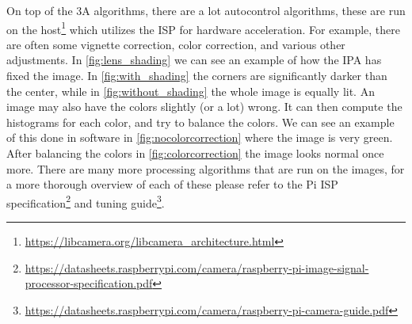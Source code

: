 On top of the 3A algorithms, there are a lot autocontrol algorithms, these are
run on the host\footnote{\url{https://libcamera.org/libcamera_architecture.html}}
which utilizes the ISP for hardware acceleration. For example, there are often some
vignette correction, color correction, and various other adjustments. In
\cref{fig:lens_shading} we can see an example of how the IPA has fixed the
image. In \cref{fig:with_shading} the corners are significantly darker than the
center, while in \cref{fig:without_shading} the whole image is equally lit. An
image may also have the colors slightly (or a lot) wrong. It can then compute
the histograms for each color, and try to balance the colors. We can see an
example of this done in software in \cref{fig:nocolorcorrection} where the
image is very green. After balancing the colors in \cref{fig:colorcorrection}
the image looks normal once more. There are many more processing algorithms
that are run on the images, for a more thorough overview of each of these
please refer to the Pi ISP
specification\footnote{\url{https://datasheets.raspberrypi.com/camera/raspberry-pi-image-signal-processor-specification.pdf}}
and tuning
guide\footnote{\url{https://datasheets.raspberrypi.com/camera/raspberry-pi-camera-guide.pdf}}.

